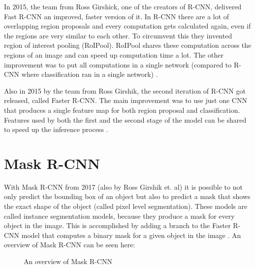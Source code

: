 In 2015, the team from Ross Girshick, one of the creators of R-CNN, delivered Fast R-CNN an improved, faster version of it. In R-CNN there are a lot of overlapping region proposals and every computation gets calculated again, even if the regions are very similar to each other. To circumvent this they invented region of interest pooling (RoIPool). RoIPool shares these computation across the regions of an image and can speed up computation time a lot. The other improvement was to put all computations in a single network (compared to R-CNN where classification ran in a single network) \cite{Fast R-CNN}.

Also in 2015 by the team from Ross Girshik, the second iteration of R-CNN got released, called Faster R-CNN. The main improvement was to use just one CNN that produces a single feature map for both region proposal and classification. Features used by both the first and the second stage of the model can be shared to speed up the inference process \cite{Faster R-CNN}.

\section{Mask R-CNN}

With Mask R-CNN from 2017 (also by Ross Girshik et. al) it is possible to not only predict the bounding box of an object but also to predict a mask that shows the exact shape of the object (called pixel level segmentation). These models are called instance segmentation models, because they produce a mask for every object in the image. This is accomplished by adding a branch to the Faster R-CNN model that computes a binary mask for a given object in the image \cite{Mask R-CNN}. An overview of Mask R-CNN can be seen here:

\begin{figure}[H]
	\caption{\label{fig:maskrcnn2} An overview of Mask R-CNN}
\end{figure}

